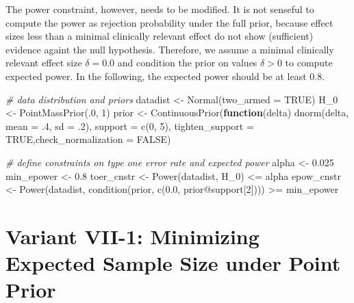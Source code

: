 \documentclass[
]{book}
\newenvironment{Shaded}{\begin{snugshade}}{\end{snugshade}}
\newcommand{\AttributeTok}[1]{\textcolor[rgb]{0.77,0.63,0.00}{#1}}
\newcommand{\CommentTok}[1]{\textcolor[rgb]{0.56,0.35,0.01}{\textit{#1}}}
\newcommand{\ConstantTok}[1]{\textcolor[rgb]{0.00,0.00,0.00}{#1}}
\newcommand{\ControlFlowTok}[1]{\textcolor[rgb]{0.13,0.29,0.53}{\textbf{#1}}}
\newcommand{\DecValTok}[1]{\textcolor[rgb]{0.00,0.00,0.81}{#1}}
\newcommand{\FloatTok}[1]{\textcolor[rgb]{0.00,0.00,0.81}{#1}}
\newcommand{\FunctionTok}[1]{\textcolor[rgb]{0.00,0.00,0.00}{#1}}
\newcommand{\NormalTok}[1]{#1}
\newcommand{\OtherTok}[1]{\textcolor[rgb]{0.56,0.35,0.01}{#1}}
\newcommand{\SpecialCharTok}[1]{\textcolor[rgb]{0.00,0.00,0.00}{#1}}
\begin{document}
The power constraint, however, needs to be modified. It is not senseful to compute the power as rejection probability under the full prior, because effect sizes less than a minimal clinically relevant effect do not show (sufficient) evidence againt the null hypothesis. Therefore, we assume a minimal clinically relevant effect size \(\delta=0.0\) and condition the prior on values \(\delta>0\) to compute expected power. In the following, the expected power should be at least \(0.8\).

\begin{Shaded}
\begin{Highlighting}[]
\CommentTok{\# data distribution and priors}
\NormalTok{datadist   }\OtherTok{\textless{}{-}} \FunctionTok{Normal}\NormalTok{(}\AttributeTok{two\_armed =} \ConstantTok{TRUE}\NormalTok{)}
\NormalTok{H\_0        }\OtherTok{\textless{}{-}} \FunctionTok{PointMassPrior}\NormalTok{(.}\DecValTok{0}\NormalTok{, }\DecValTok{1}\NormalTok{)}
\NormalTok{prior      }\OtherTok{\textless{}{-}} \FunctionTok{ContinuousPrior}\NormalTok{(}\ControlFlowTok{function}\NormalTok{(delta) }\FunctionTok{dnorm}\NormalTok{(delta, }\AttributeTok{mean =}\NormalTok{ .}\DecValTok{4}\NormalTok{, }\AttributeTok{sd =}\NormalTok{ .}\DecValTok{2}\NormalTok{),}
                              \AttributeTok{support =} \FunctionTok{c}\NormalTok{(}\DecValTok{0}\NormalTok{, }\DecValTok{5}\NormalTok{),}
                              \AttributeTok{tighten\_support =} \ConstantTok{TRUE}\NormalTok{,}\AttributeTok{check\_normalization =} \ConstantTok{FALSE}\NormalTok{)}

\CommentTok{\# define constraints on type one error rate and expected power}
\NormalTok{alpha      }\OtherTok{\textless{}{-}} \FloatTok{0.025}
\NormalTok{min\_epower }\OtherTok{\textless{}{-}} \FloatTok{0.8}
\NormalTok{toer\_cnstr }\OtherTok{\textless{}{-}} \FunctionTok{Power}\NormalTok{(datadist, H\_0) }\SpecialCharTok{\textless{}=}\NormalTok{ alpha}
\NormalTok{epow\_cnstr }\OtherTok{\textless{}{-}} \FunctionTok{Power}\NormalTok{(datadist, }\FunctionTok{condition}\NormalTok{(prior, }\FunctionTok{c}\NormalTok{(}\FloatTok{0.0}\NormalTok{, prior}\SpecialCharTok{@}\NormalTok{support[}\DecValTok{2}\NormalTok{]))) }\SpecialCharTok{\textgreater{}=}\NormalTok{ min\_epower}
\end{Highlighting}
\end{Shaded}

\hypertarget{scenarioVII_1}{%
\section{Variant VII-1: Minimizing Expected Sample Size under Point Prior}\label{scenarioVII_1}}
\end{document}
